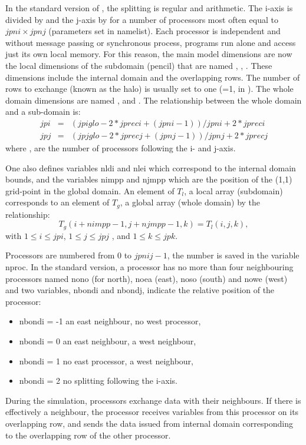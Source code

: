 \documentclass[../tex_main/NEMO_manual]{subfiles}
\begin{document}
In the standard version of \NEMO, the splitting is regular and arithmetic.
The i-axis is divided by  and
the j-axis by  for a number of processors  most often equal to $jpni \times jpnj$
(parameters set in   namelist).
Each processor is independent and without message passing or synchronous process,
programs run alone and access just its own local memory.
For this reason, the main model dimensions are now the local dimensions of the subdomain (pencil) that
are named , , .
These dimensions include the internal domain and the overlapping rows.
The number of rows to exchange (known as the halo) is usually set to one (=1, in ).
The whole domain dimensions are named ,  and .
The relationship between the whole domain and a sub-domain is:
\begin{align} 
      jpi & = & ( jpiglo-2*jpreci + (jpni-1) ) / jpni + 2*jpreci  \nonumber \\
      jpj & = & ( jpjglo-2*jprecj + (jpnj-1) ) / jpnj + 2*jprecj  \label{eq:lbc_jpi}
\end{align}
where ,  are the number of processors following the i- and j-axis.

One also defines variables nldi and nlei which correspond to the internal domain bounds, 
and the variables nimpp and njmpp which are the position of the (1,1) grid-point in the global domain. 
An element of $T_{l}$, a local array (subdomain) corresponds to an element of $T_{g}$,
a global array (whole domain) by the relationship: 
\begin{equation} \label{eq:lbc_nimpp}
T_{g} (i+nimpp-1,j+njmpp-1,k) = T_{l} (i,j,k),
\end{equation}
with  $1 \leq i \leq jpi$, $1  \leq j \leq jpj $ , and  $1  \leq k \leq jpk$.

Processors are numbered from 0 to $jpnij-1$, the number is saved in the variable nproc.
In the standard version, a processor has no more than
four neighbouring processors named nono (for north), noea (east), noso (south) and nowe (west) and
two variables, nbondi and nbondj, indicate the relative position of the processor:
\begin{itemize}
\item 		nbondi = -1 	an east neighbour, no west processor,
\item 		nbondi =  0	an east neighbour, a west neighbour,
\item 		nbondi =  1 	no east processor, a west neighbour,
\item 		nbondi =  2 	no splitting following the i-axis.
\end{itemize}
During the simulation, processors exchange data with their neighbours.
If there is effectively a neighbour, the processor receives variables from this processor on its overlapping row,
and sends the data issued from internal domain corresponding to the overlapping row of the other processor.
\end{document}

